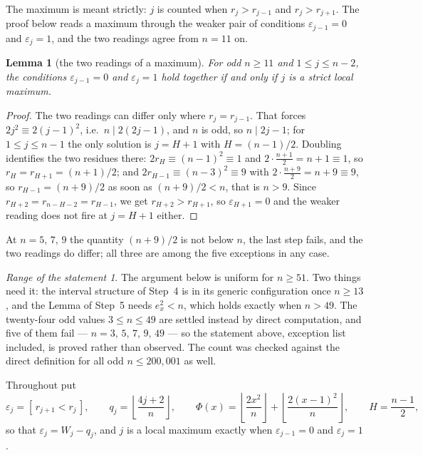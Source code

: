 \documentclass[11pt,reqno]{amsart}
\theoremstyle{plain}
\newtheorem*{lemma}{Lemma}
\theoremstyle{remark}
\newtheorem*{rangeofstatement}{Range of the statement}
\numberwithin{equation}{section}
\newcommand{\fl}[1]{\left\lfloor #1 \right\rfloor}
\begin{document}
The maximum is meant strictly: $j$ is counted when $r_j > r_{j-1}$ and
$r_j > r_{j+1}$. The proof below reads a maximum through the weaker pair of
conditions $\varepsilon_{j-1} = 0$ and $\varepsilon_j = 1$, and the two readings
agree from $n = 11$ on.

\begin{lemma}[the two readings of a maximum]
For odd $n \ge 11$ and $1 \le j \le n-2$, the conditions $\varepsilon_{j-1} = 0$
and $\varepsilon_j = 1$ hold together if and only if $j$ is a strict local
maximum.
\end{lemma}

\begin{proof}
The two readings can differ only where $r_j = r_{j-1}$. That forces
$2j^2 \equiv 2(j-1)^2$, i.e.\ $n \mid 2(2j-1)$, and $n$ is odd, so
$n \mid 2j-1$; for $1 \le j \le n-1$ the only solution is $j = H+1$ with
$H = (n-1)/2$. Doubling identifies the two residues there:
$2r_H \equiv (n-1)^2 \equiv 1$ and $2 \cdot \frac{n+1}{2} = n+1 \equiv 1$, so
$r_H = r_{H+1} = (n+1)/2$; and $2r_{H-1} \equiv (n-3)^2 \equiv 9$ with
$2 \cdot \frac{n+9}{2} = n+9 \equiv 9$, so $r_{H-1} = (n+9)/2$ as soon as
$(n+9)/2 < n$, that is $n > 9$. Since $r_{H+2} = r_{n-H-2} = r_{H-1}$, we get
$r_{H+2} > r_{H+1}$, so $\varepsilon_{H+1} = 0$ and the weaker reading does not
fire at $j = H+1$ either.
\end{proof}

At $n = 5,\,7,\,9$ the quantity $(n+9)/2$ is not below $n$, the last step fails,
and the two readings do differ; all three are among the five exceptions in any
case.

\begin{rangeofstatement}
The argument below is uniform for $n \ge 51$. Two things need it: the interval
structure of Step~4 is in its generic configuration once $n \ge 13$, and the
Lemma of Step~5 needs $e_x^2 < n$, which holds exactly when $n > 49$. The
twenty-four odd values $3 \le n \le 49$ are settled instead by direct
computation, and five of them fail --- $n = 3,\,5,\,7,\,9,\,49$ --- so the
statement above, exception list included, is proved rather than observed. The
count was checked against the direct definition for all odd $n \le 200{,}001$ as
well.
\end{rangeofstatement}

Throughout put
\[
  \varepsilon_j = [\,r_{j+1} < r_j\,], \qquad
  q_j = \fl{\frac{4j+2}{n}}, \qquad
  \Phi(x) = \fl{\frac{2x^2}{n}} + \fl{\frac{2(x-1)^2}{n}}, \qquad
  H = \frac{n-1}{2},
\]
so that $\varepsilon_j = W_j - q_j$, and $j$ is a local maximum exactly when
$\varepsilon_{j-1} = 0$ and $\varepsilon_j = 1$.
\end{document}
